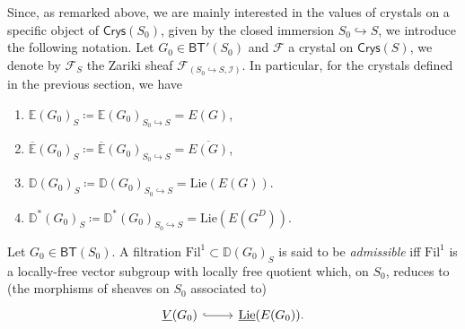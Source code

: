 \begin{ntt}[]\label{CrystalAssociatedZarSheafS}
	Since, as remarked above, we are mainly interested in the values of
	crystals on a specific object of $\mathsf{Crys}(S_0)$, given
	by the closed immersion $S_0 \hookrightarrow S$, we introduce the following notation.
	Let $G_0 \in \mathsf{BT}'(S_0)$ and $\mathscr{F}$ a crystal on $\mathsf{Crys}(S)$,
	we denote by $\mathscr{F}_S$ the Zariki sheaf
	$\mathscr{F}_{\left(S_0 \hookrightarrow S, \mathcal{I}\right)}$.
	In particular, for the crystals defined in the previous section, we have
\begin{enumerate}
	\item $\mathbb{E}(G_0)_S \coloneqq \mathbb{E}(G_0)_{S_0 \hookrightarrow S} = E(G)$,
	\item $\overline{\mathbb{E}}(G_0)_S \coloneqq \overline{\mathbb{E}}(G_0)_{S_0 \hookrightarrow S} = 
		\overline{E(G)}$,
	\item $\mathbb{D}(G_0)_S \coloneqq \mathbb{D}(G_0)_{S_0 \hookrightarrow S} = 
		\mathrm{Lie}(E(G))$.
	\item $\mathbb{D}^*(G_0)_S \coloneqq \mathbb{D}^*(G_0)_{S_0 \hookrightarrow S} = 
		\mathrm{Lie}(E(G^D))$.
\end{enumerate}
\end{ntt}


\begin{defn}
	Let $G_0 \in \mathsf{BT}(S_0)$.
	A filtration $\mathrm{Fil}^1 \subset \mathbb{D}(G_0)_S$ is said to be
	{\em admissible} iff $\mathrm{Fil}^1$ is a locally-free vector subgroup
	with locally free quotient which, on $S_0$, reduces to
	(the morphisms of sheaves on $S_0$ associated to)
	\begin{equation*}
	\begin{tikzcd}[row sep = 0ex
		,/tikz/column 1/.append style={anchor=base east}
		,/tikz/column 2/.append style={anchor=base west}]
		\underline{V}(G_0) \arrow[r, "", hookrightarrow] &
		\underline{\mathrm{Lie}}(E(G_0))
	.\end{tikzcd}
	\end{equation*} 
\end{defn}


